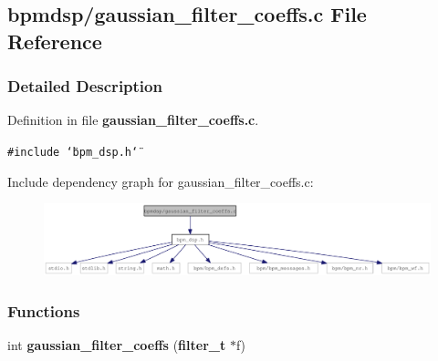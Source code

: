\subsection{bpmdsp/gaussian\_\-filter\_\-coeffs.c File Reference}
\label{gaussian__filter__coeffs_8c}


\subsubsection{Detailed Description}


Definition in file {\bf gaussian\_\-filter\_\-coeffs.c}.

{\tt \#include \char`\"{}bpm\_\-dsp.h\char`\"{}}\par


Include dependency graph for gaussian\_\-filter\_\-coeffs.c:\nopagebreak
\begin{figure}[H]
\begin{center}
\leavevmode
\includegraphics[width=409pt]{gaussian__filter__coeffs_8c__incl}
\end{center}
\end{figure}
\subsubsection*{Functions}
\begin{CompactItemize}
\item 
int {\bf gaussian\_\-filter\_\-coeffs} ({\bf filter\_\-t} $\ast$f)
\end{CompactItemize}
